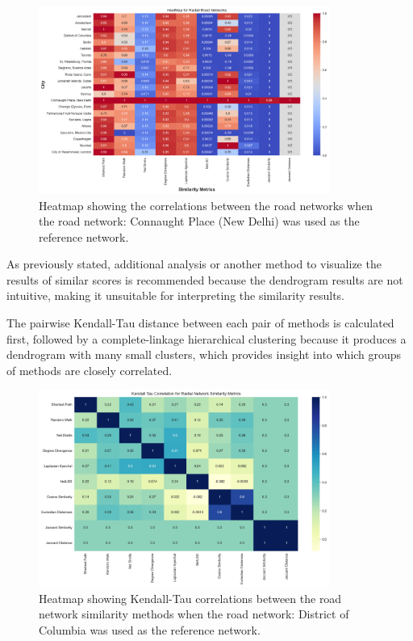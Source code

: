 \begin{figure}[!ht]
\centering
\includegraphics[width=0.85\textwidth,center]{picture/Radial/radialheatmap.png}
\caption[Heatmap showing the correlations for Radial Road Networks]{Heatmap showing the correlations between the road networks when the road network: Connaught Place (New Delhi) was used as the reference network.}
\label{fig:Heatmap showing the correlations for Radial Road Networks}
\end{figure}

As previously stated, additional analysis or another method to visualize the results of similar scores is recommended because the dendrogram results are not intuitive, making it unsuitable for interpreting the similarity results.

The pairwise Kendall-Tau distance between each pair of methods is calculated first, followed by a complete-linkage hierarchical clustering because it produces a dendrogram with many small clusters, which provides insight into which groups of methods are closely correlated.

\begin{figure}[!ht]
\centering
\includegraphics[width=0.85\textwidth,center]{picture/Radial/radial2.png}
\caption[Heatmap showing Kendall-Tau correlations between the road network similarity methods for Radial Road Networks]{Heatmap showing Kendall-Tau correlations between the road network similarity methods when the road network: District of Columbia was used as the reference network.}
\label{fig:network ranking radial}
\end{figure}

